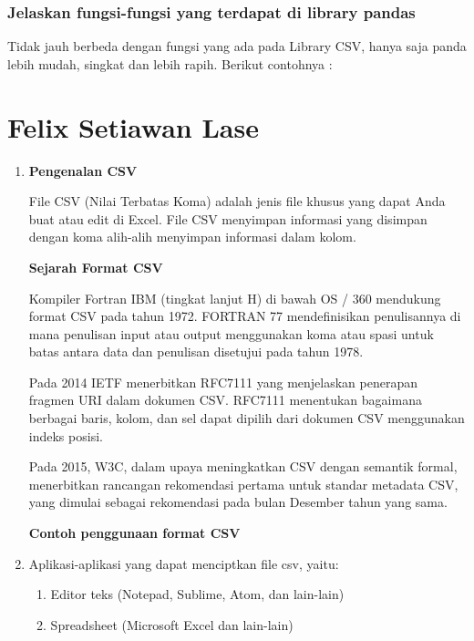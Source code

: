 \subsubsection{Jelaskan fungsi-fungsi yang terdapat di library pandas}
Tidak jauh berbeda dengan fungsi yang ada pada Library CSV, hanya saja panda lebih mudah, singkat dan lebih rapih. Berikut contohnya :

\section{Felix Setiawan Lase}

\begin{enumerate}
	\item 
	\textbf{Pengenalan CSV}
	
	File CSV (Nilai Terbatas Koma) adalah jenis file khusus yang dapat Anda buat atau edit di Excel. File CSV menyimpan informasi yang disimpan dengan koma alih-alih menyimpan informasi dalam kolom.
	
	\textbf{Sejarah Format CSV}
	
	Kompiler Fortran IBM (tingkat lanjut H) di bawah OS / 360 mendukung format CSV pada tahun 1972. FORTRAN 77 mendefinisikan penulisannya di mana penulisan input atau output menggunakan koma atau spasi untuk batas antara data dan penulisan disetujui pada tahun 1978.

Pada 2014 IETF menerbitkan RFC7111 yang menjelaskan penerapan fragmen URI dalam dokumen CSV. RFC7111 menentukan bagaimana berbagai baris, kolom, dan sel dapat dipilih dari dokumen CSV menggunakan indeks posisi.

Pada 2015, W3C, dalam upaya meningkatkan CSV dengan semantik formal, menerbitkan rancangan rekomendasi pertama untuk standar metadata CSV, yang dimulai sebagai rekomendasi pada bulan Desember tahun yang sama.
	
	\textbf{Contoh penggunaan format CSV}
	
	
	
	\item Aplikasi-aplikasi yang dapat menciptkan file csv, yaitu:
	\begin{enumerate}
		\item Editor teks (Notepad, Sublime, Atom, dan lain-lain)
		\item Spreadsheet (Microsoft Excel dan lain-lain)
	\end{enumerate}
	

\end{enumerate}
